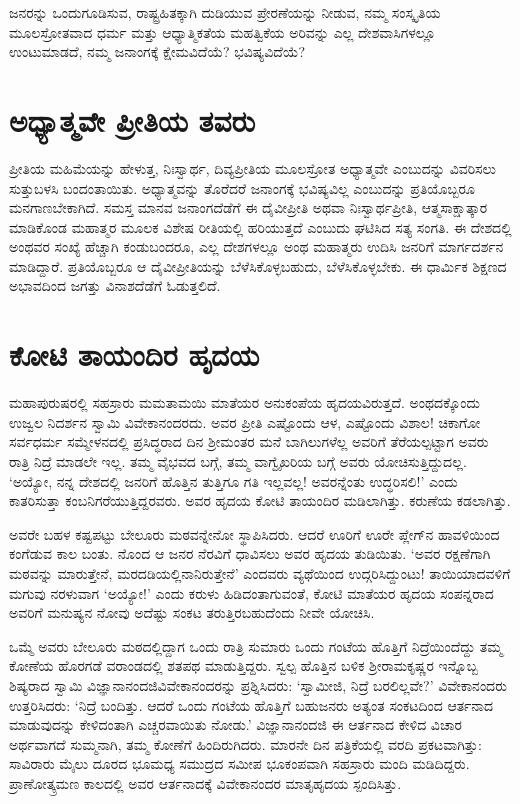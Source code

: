 ಜನರನ್ನು ಒಂದುಗೂಡಿಸುವ, ರಾಷ್ಟ್ರಹಿತಕ್ಕಾಗಿ ದುಡಿಯುವ ಪ್ರೇರಣೆಯನ್ನು ನೀಡುವ, ನಮ್ಮ ಸಂಸ್ಕೃತಿಯ ಮೂಲಸ್ರೋತವಾದ ಧರ್ಮ ಮತ್ತು ಆಧ್ಯಾತ್ಮಿಕತೆಯ ಮಹತ್ವಿಕೆಯ ಅರಿವನ್ನು ಎಲ್ಲ ದೇಶವಾಸಿಗಳಲ್ಲೂ ಉಂಟುಮಾಡದೆ, ನಮ್ಮ ಜನಾಂಗಕ್ಕೆ ಕ್ಷೇಮವಿದೆಯೆ? ಭವಿಷ್ಯವಿದೆಯೆ?


\section*{ಅಧ್ಯಾತ್ಮವೇ ಪ್ರೀತಿಯ ತವರು}


ಪ್ರೀತಿಯ ಮಹಿಮೆಯನ್ನು ಹೇಳುತ್ತ, ನಿಃಸ್ವಾರ್ಥ, ದಿವ್ಯಪ್ರೀತಿಯ ಮೂಲಸ್ರೋತ ಅಧ್ಯಾತ್ಮವೇ ಎಂಬುದನ್ನು ವಿವರಿಸಲು ಸುತ್ತುಬಳಸಿ ಬಂದಂತಾಯಿತು. ಅಧ್ಯಾತ್ಮವನ್ನು ತೊರೆದರೆ ಜನಾಂಗಕ್ಕೆ ಭವಿಷ್ಯವಿಲ್ಲ ಎಂಬುದನ್ನು ಪ್ರತಿಯೊಬ್ಬರೂ ಮನಗಾಣಬೇಕಾಗಿದೆ. ಸಮಸ್ತ ಮಾನವ ಜನಾಂಗ\-ದೆಡೆಗೆ ಈ ದೈವೀಪ್ರೀತಿ ಅಥವಾ ನಿಃಸ್ವಾರ್ಥಪ್ರೀತಿ, ಆತ್ಮಸಾಕ್ಷಾತ್ಕಾರ ಮಾಡಿಕೊಂಡ ಮಹಾತ್ಮರ ಮೂಲಕ ವಿಶೇಷ ರೀತಿಯಲ್ಲಿ ಹರಿಯುತ್ತದೆ ಎಂಬುದು ಘಟಿಸಿದ ಸತ್ಯ ಸಂಗತಿ. ಈ ದೇಶದಲ್ಲಿ ಅಂಥವರ ಸಂಖ್ಯೆ ಹೆಚ್ಚಾಗಿ ಕಂಡುಬಂದರೂ, ಎಲ್ಲ ದೇಶಗಳಲ್ಲೂ ಅಂಥ ಮಹಾತ್ಮರು ಉದಿಸಿ ಜನರಿಗೆ ಮಾರ್ಗದರ್ಶನ ಮಾಡಿದ್ದಾರೆ. ಪ್ರತಿಯೊಬ್ಬರೂ ಆ ದೈವೀಪ್ರೀತಿಯನ್ನು ಬೆಳೆಸಿಕೊಳ್ಳಬಹುದು, ಬೆಳೆಸಿಕೊಳ್ಳಬೇಕು. ಈ ಧಾರ್ಮಿಕ ಶಿಕ್ಷಣದ ಅಭಾವದಿಂದ ಜಗತ್ತು ವಿನಾಶದೆಡೆಗೆ ಓಡುತ್ತಲಿದೆ.


\section*{ಕೋಟಿ ತಾಯಂದಿರ ಹೃದಯ}


ಮಹಾಪುರುಷರಲ್ಲಿ ಸಹಸ್ರಾರು ಮಮತಾಮಯಿ ಮಾತೆಯರ ಅನುಕಂಪೆಯ ಹೃದಯವಿರುತ್ತದೆ. ಅಂಥದಕ್ಕೊಂದು ಉಜ್ವಲ ನಿದರ್ಶನ ಸ್ವಾಮಿ ವಿವೇಕಾನಂದರದು. ಅವರ ಪ್ರೀತಿ ಎಷ್ಟೊಂದು ಆಳ, ಎಷ್ಟೊಂದು ವಿಶಾಲ! ಚಿಕಾಗೋ ಸರ್ವಧರ್ಮ ಸಮ್ಮೇಳನದಲ್ಲಿ ಪ್ರಸಿದ್ಧರಾದ ದಿನ ಶ‍್ರೀಮಂತರ ಮನೆ ಬಾಗಿಲುಗಳೆಲ್ಲ ಅವರಿಗೆ ತೆರೆಯಲ್ಪಟ್ಟಾಗ ಅವರು ರಾತ್ರಿ ನಿದ್ರೆ ಮಾಡಲೇ ಇಲ್ಲ. ತಮ್ಮ ವೈಭವದ ಬಗ್ಗೆ, ತಮ್ಮ ವಾಗ್ವೈಖರಿಯ ಬಗ್ಗೆ ಅವರು ಯೋಚಿಸುತ್ತಿದ್ದುದಲ್ಲ. ‘ಅಯ್ಯೋ, ನನ್ನ ದೇಶದಲ್ಲಿ ಜನರಿಗೆ ಹೊತ್ತಿನ ತುತ್ತಿಗೂ ಗತಿ ಇಲ್ಲವಲ್ಲ! ಅವರನ್ನೆಂತು ಉದ್ಧರಿಸಲಿ!’ ಎಂದು ಕಾತರಿಸುತ್ತಾ ಕಂಬನಿಗರೆಯುತ್ತಿದ್ದರವರು. ಅವರ ಹೃದಯ ಕೋಟಿ ತಾಯಂದಿರ ಮಡಿಲಾಗಿತ್ತು. ಕರುಣೆಯ ಕಡಲಾಗಿತ್ತು.

ಅವರೇ ಬಹಳ ಕಷ್ಟಪಟ್ಟು ಬೇಲೂರು ಮಠವನ್ನೇನೋ ಸ್ಥಾಪಿಸಿದರು. ಆದರೆ ಊರಿಗೆ ಊರೇ ಪ್ಲೇಗ್​ನ ಹಾವಳಿಯಿಂದ ಕಂಗೆಡುವ ಕಾಲ ಬಂತು. ನೊಂದ ಆ ಜನರ ನೆರವಿಗೆ ಧಾವಿಸಲು ಅವರ ಹೃದಯ ತುಡಿಯಿತು. ‘ಅವರ ರಕ್ಷಣೆಗಾಗಿ ಮಠವನ್ನು ಮಾರುತ್ತೇನೆ, ಮರದಡಿಯಲ್ಲಿ\break ನಾನಿರುತ್ತೇನೆ’ ಎಂದವರು ವ್ಯಥೆಯಿಂದ ಉದ್ಗರಿಸಿದ್ದುಂಟು! ತಾಯಿಯಾದವಳಿಗೆ ಮಗುವು ನರಳುವಾಗ ‘ಅಯ್ಯೋ!’ ಎಂದು ಕರುಳು ಹಿಡಿದಂತಾಗುವಂತೆ, ಕೋಟಿ ಮಾತೆಯರ ಹೃದಯ ಸಂಪನ್ನರಾದ ಅವರಿಗೆ ಮನುಷ್ಯನ ನೋವು ಅದೆಷ್ಟು ಸಂಕಟ ತರುತ್ತಿರಬಹುದೆಂದು ನೀವೇ ಯೋಚಿಸಿ.

ಒಮ್ಮೆ ಅವರು ಬೇಲೂರು ಮಠದಲ್ಲಿದ್ದಾಗ ಒಂದು ರಾತ್ರಿ ಸುಮಾರು ಒಂದು ಗಂಟೆಯ ಹೊತ್ತಿಗೆ ನಿದ್ರೆಯಿಂದೆದ್ದು ತಮ್ಮ ಕೋಣೆಯ ಹೊರಗಡೆ ವರಾಂಡದಲ್ಲಿ ಶತಪಥ ಮಾಡುತ್ತಿದ್ದರು. ಸ್ವಲ್ಪ ಹೊತ್ತಿನ ಬಳಿಕ ಶ‍್ರೀರಾಮಕೃಷ್ಣರ ಇನ್ನೊಬ್ಬ ಶಿಷ್ಯರಾದ ಸ್ವಾಮಿ ವಿಜ್ಞಾನಾನಂದಜಿ\break ವಿವೇಕಾನಂದರನ್ನು ಪ್ರಶ್ನಿಸಿದರು: ‘ಸ್ವಾಮೀಜಿ, ನಿದ್ರೆ ಬರಲಿಲ್ಲವೇ?’ ವಿವೇಕಾನಂದರು ಉತ್ತರಿಸಿದರು: ‘ನಿದ್ರೆ ಬಂದಿತ್ತು. ಆದರೆ ಒಂದು ಗಂಟೆಯ ಹೊತ್ತಿಗೆ ಬಹುಜನರು ಅತ್ಯಂತ ಸಂಕಟದಿಂದ ಆರ್ತನಾದ ಮಾಡುವುದನ್ನು ಕೇಳಿದಂತಾಗಿ ಎಚ್ಚರವಾಯಿತು ನೋಡು.’ ವಿಜ್ಞಾನಾನಂದಜಿ ಈ ಆರ್ತನಾದ ಕೇಳಿದ ವಿಚಾರ ಅರ್ಥವಾಗದೆ ಸುಮ್ಮನಾಗಿ, ತಮ್ಮ ಕೋಣೆಗೆ ಹಿಂದಿರುಗಿದರು. ಮಾರನೇ ದಿನ ಪತ್ರಿಕೆಯಲ್ಲಿ ವರದಿ ಪ್ರಕಟವಾಗಿತ್ತು: ಸಾವಿರಾರು ಮೈಲು ದೂರದ ಭೂಮಧ್ಯ ಸಮುದ್ರದ ಸಮೀಪ ಭೂಕಂಪವಾಗಿ ಸಹಸ್ರಾರು ಮಂದಿ ಮಡಿದಿದ್ದರು. ಪ್ರಾಣೋತ್ಕ್ರಮಣ ಕಾಲದಲ್ಲಿ ಅವರ ಆರ್ತನಾದಕ್ಕೆ ವಿವೇಕಾನಂದರ ಮಾತೃಹೃದಯ ಸ್ಪಂದಿಸಿತ್ತು.

